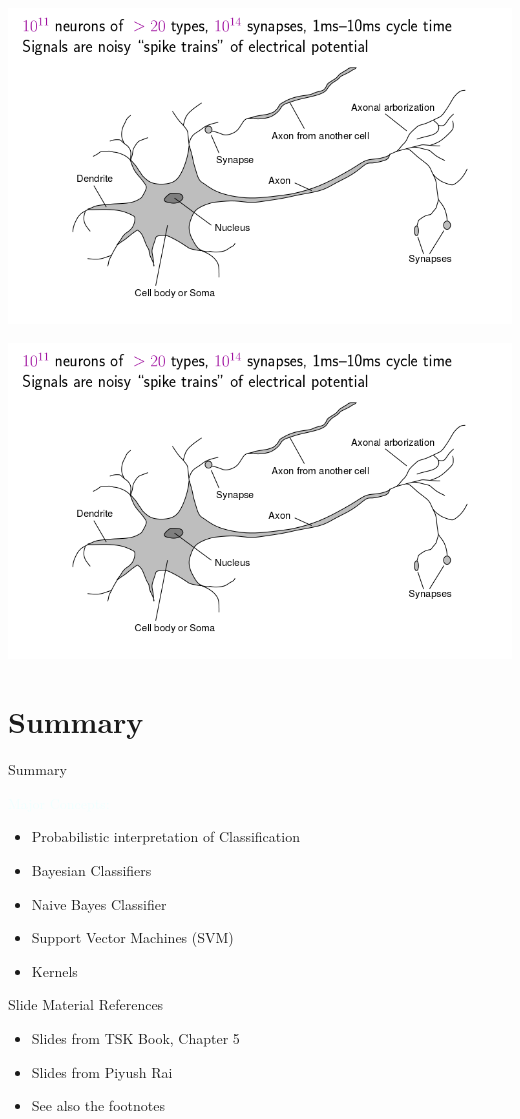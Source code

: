 \documentclass{beamer}
\newcommand{\tblue}[1]{{\Large {\textcolor{azure}{#1}}}}
\begin{document}
\begin{frame}{}
    \begin{center}
        \includegraphics[scale=0.4]{brains.png}
    \end{center}
\end{frame}
\begin{frame}{}
    \begin{center}
        \includegraphics[scale=0.4]{brains.png}
    \end{center}
\end{frame}

\section{Summary}
\begin{frame}{Summary}

\tblue{Major Concepts:}
\begin{itemize}
    \item Probabilistic interpretation of Classification
    \item Bayesian Classifiers
    \item Naive Bayes Classifier
    \item Support Vector Machines (SVM)
    \item Kernels
\end{itemize}
\end{frame}

\begin{frame}{Slide Material References}
\begin{itemize}
    \item Slides from TSK Book, Chapter 5 
    \item Slides from Piyush Rai 
    \item See also the footnotes
\end{itemize}
\end{frame}
\end{document}
